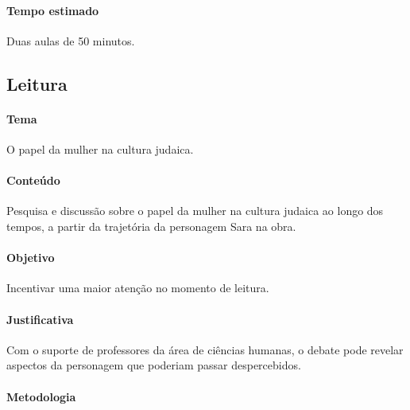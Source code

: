 \documentclass[12pt]{extarticle}
\begin{document}
\paragraph{Tempo estimado} Duas aulas de 50 minutos.


\subsection{Leitura}

\paragraph{Tema} O papel da mulher na cultura judaica.

\paragraph{Conteúdo} Pesquisa e discussão sobre
o papel da mulher na cultura judaica ao longo dos tempos, 
a partir da trajetória da personagem Sara na obra.

\paragraph{Objetivo} Incentivar uma maior atenção no momento de leitura.

\paragraph{Justificativa} Com o suporte de professores da área
de ciências humanas, o debate pode revelar aspectos da personagem
que poderiam passar despercebidos.

\paragraph{Metodologia}
\end{document}
